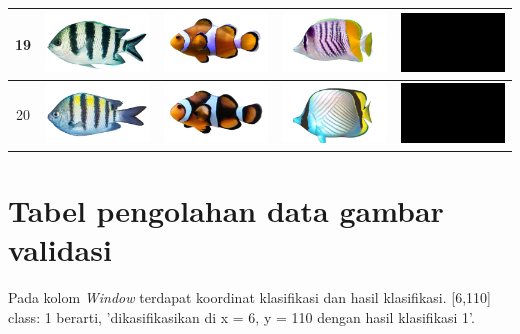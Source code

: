\begin{longtable}{|c|c|c|c|c|}
    19 & \includegraphics[width=3cm]{gambar/abudefduf/A19} & \includegraphics[width=3cm]{gambar/amphiprion/A19} & \includegraphics[width=3cm]{gambar/chaetodon/C19} & \includegraphics[width=3cm]{gambar/negative_examples/N19} \\
    \hline
    20 & \includegraphics[width=3cm]{gambar/abudefduf/A20} & \includegraphics[width=3cm]{gambar/amphiprion/A20} & \includegraphics[width=3cm]{gambar/chaetodon/C20} & \includegraphics[width=3cm]{gambar/negative_examples/N20} \\
    \hline
\end{longtable}

\chapter{Tabel pengolahan data gambar validasi}
Pada kolom \textit{Window} terdapat koordinat klasifikasi dan hasil klasifikasi. [6,110] class: 1 
berarti, 'dikasifikasikan di x = 6, y = 110 dengan hasil klasifikasi 1'.

